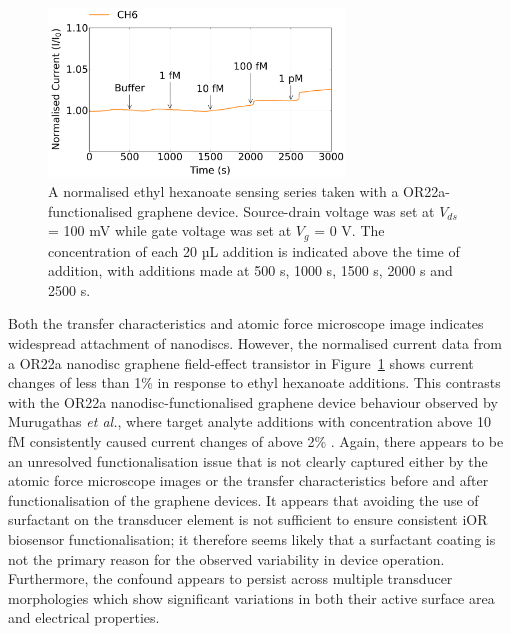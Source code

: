 \documentclass[
  a4paper,
]{scrbook}
\begin{document}
\begin{figure}

{\centering \includegraphics[width=0.7\textwidth,height=\textheight]{figures/ch7/Q3C3_filtered_detrend_trunc_arrows_normalised_edit.png}

}

\caption{\label{fig-graphene-sensing}A normalised ethyl hexanoate
sensing series taken with a OR22a-functionalised graphene device.
Source-drain voltage was set at \(V_{ds}\) = 100 mV while gate voltage
was set at \(V_g\) = 0 V. The concentration of each 20 µL addition is
indicated above the time of addition, with additions made at 500 s, 1000
s, 1500 s, 2000 s and 2500 s.}

\end{figure}

Both the transfer characteristics and atomic force microscope image
indicates widespread attachment of nanodiscs. However, the normalised
current data from a OR22a nanodisc graphene field-effect transistor in
Figure~\ref{fig-graphene-sensing} shows current changes of less than 1\%
in response to ethyl hexanoate additions. This contrasts with the OR22a
nanodisc-functionalised graphene device behaviour observed by Murugathas
\emph{et al.}, where target analyte additions with concentration above
10 fM consistently caused current changes of above 2\%
\autocite{Murugathas2020}. Again, there appears to be an unresolved
functionalisation issue that is not clearly captured either by the
atomic force microscope images or the transfer characteristics before
and after functionalisation of the graphene devices. It appears that
avoiding the use of surfactant on the transducer element is not
sufficient to ensure consistent iOR biosensor functionalisation; it
therefore seems likely that a surfactant coating is not the primary
reason for the observed variability in device operation. Furthermore,
the confound appears to persist across multiple transducer morphologies
which show significant variations in both their active surface area and
electrical properties.
\end{document}
